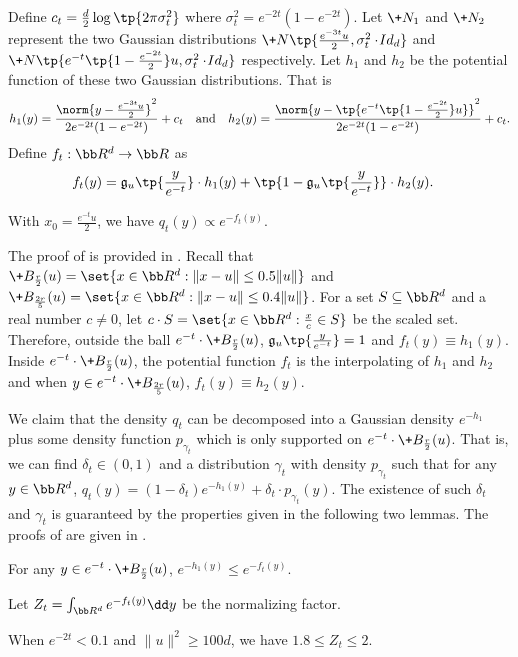 Define $c_t = \frac{d}{2}\log \tp{2\pi \sigma_t^2}$ where $\sigma_t^2 =  e^{-2t} (1-e^{-2t})$. Let $\+N_1$ and $\+N_2$ represent the two Gaussian distributions $\+N\tp{\frac{e^{-3t}u}{2}, \sigma_t^2 \cdot \!{Id}_d}$ and $\+N\tp{e^{-t}\tp{1-\frac{e^{-2t}}{2}}u, \sigma_t^2 \cdot \!{Id}_d}$ respectively. Let $h_1$ and $h_2$ be the potential function of these two Gaussian distributions. That is
\[
    h_1(y) = \frac{\norm{y-\frac{e^{-3t}u}{2}}^2}{2e^{-2t}(1-e^{-2t})} + c_t \quad \mbox{and}\quad h_2(y) = \frac{\norm{y- \tp{e^{-t}\tp{1-\frac{e^{-2t}}{2}}u }}^2}{2e^{-2t}(1-e^{-2t})} + c_t.
\]
Define $f_t:\bb R^d \to \bb R$ as 
\begin{align*}
    f_t(y) &= \mathfrak{g}_{u}\tp{\frac{y}{e^{-t}}}\cdot h_1(y) + \tp{1-\mathfrak{g}_{u}\tp{\frac{y}{e^{-t}}}}\cdot  h_2(y). 
\end{align*}

\begin{lemma}\label{lem:stitched0}
    With $x_0=\frac{e^{-t}u}{2}$, we have $q_t(y) \propto e^{-f_t(y)}$.
\end{lemma}

The proof of  is provided in . Recall that $\+B_{\frac{r}{2}}(u) = \set{x\in \bb R^d: \| x - u\| \leq 0.5 \|u\|}$ and $\+B_{\frac{2r}{5}}(u) = \set{x\in \bb R^d: \| x - u\| \leq 0.4 \|u\|}$. For a set $S\subseteq \bb R^d$ and a real number $c\neq 0$, let $c\cdot S = \set{x\in \bb R^d: \frac{x}{c}\in S}$ be the scaled set. Therefore, outside the ball $e^{-t}\cdot \+B_{\frac{r}{2}}(u)$, $\mathfrak{g}_{u}\tp{\frac{y}{e^{-t}}}=1$ and $f_t(y)\equiv h_1(y)$. Inside $e^{-t}\cdot \+B_{\frac{r}{2}}(u)$, the potential function $f_t$ is the interpolating of $h_1$ and $h_2$ and when $y\in e^{-t}\cdot \+B_{\frac{2r}{5}}(u)$, $f_t(y)\equiv h_2(y)$. 

We claim that the density $q_t$ can be decomposed into a Gaussian density $e^{-h_1}$ plus some density function $p_{\gamma_t}$ which is only supported on $e^{-t}\cdot \+B_{\frac{r}{2}}(u)$. That is, we can find $\delta_t\in (0,1)$ and a distribution $\gamma_t$ with density $p_{\gamma_t}$ such that for any $y\in \bb R^d$, $ q_t(y) = (1-\delta_t) e^{-h_1(y)} + \delta_t\cdot p_{\gamma_t}(y)$. The existence of such $\delta_t$ and $\gamma_t$ is guaranteed by the properties given in the following two lemmas. The proofs of  are given in .

\begin{lemma}\label{lem:stitched3}
    For any $y\in e^{-t}\cdot \+B_{\frac{r}{2}}(u)$, $e^{-h_1(y)} \leq e^{-f_t(y)}$.
\end{lemma}
Let $Z_t=\int_{\bb R^d} e^{-f_t(y)} \dd y$ be the normalizing factor.
\begin{lemma}\label{lem:normalizing}
    When $e^{-2t}<0.1$ and $\|u\|^2\geq 100d$, we have $1.8\leq Z_t\leq 2$.
\end{lemma}


